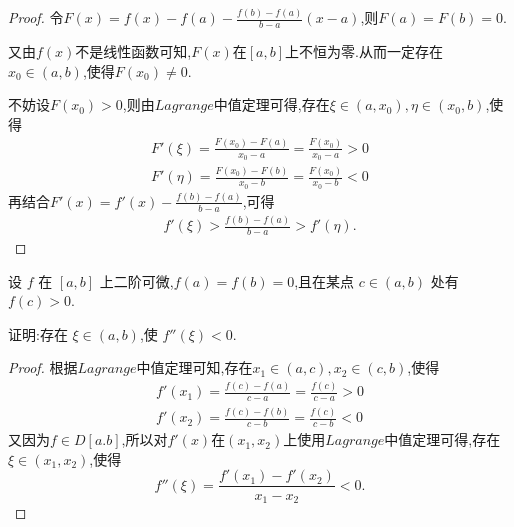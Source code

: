 \documentclass[lang=cn,newtx,10pt,scheme=chinese]{elegantbook}
\begin{document}
\begin{proof}
    令$F\left( x \right) =f\left( x \right) -f\left( a \right) -\frac{f\left( b \right) -f\left( a \right)}{b-a}\left( x-a \right)$,则$F(a)=F(b)=0$.
    
    又由$f(x)$不是线性函数可知,$F(x)$在$[a,b]$上不恒为零.从而一定存在$x_0\in(a,b)$,使得$F(x_0)\ne0$.
    
    不妨设$F(x_0)>0$,则由$Lagrange$中值定理可得,存在$\xi\in(a,x_0),\eta\in(x_0,b)$,使得
    \begin{gather}
        F'\left( \xi \right) =\frac{F\left( x_0 \right) -F\left( a \right)}{x_0-a}=\frac{F\left( x_0 \right)}{x_0-a}>0
        \nonumber\\
        F'\left( \eta \right) =\frac{F\left( x_0 \right) -F\left( b \right)}{x_0-b}=\frac{F\left( x_0 \right)}{x_0-b}<0        
        \nonumber
    \end{gather}
    再结合$F'(x)=f'(x)-\frac{f\left( b \right) -f\left( a \right)}{b-a}$,可得
    \begin{gather}
        f'(\xi)>\frac{f(b)-f(a)}{b-a}>f'(\eta).
        \nonumber
    \end{gather}
\end{proof}

\begin{exercise}
    设 \( f \) 在 \([a, b]\) 上二阶可微,\( f(a) = f(b) = 0 \),且在某点 \( c \in (a, b) \) 处有 \( f(c) > 0 \).
    
    证明:存在 \(\xi \in (a, b)\),使 \( f''(\xi) < 0 \).    
\end{exercise}
\begin{proof}
    根据$Lagrange$中值定理可知,存在$x_1\in(a,c),x_2\in(c,b)$,使得
    \begin{gather}
        f'\left( x_1 \right) =\frac{f\left( c \right) -f\left( a \right)}{c-a}=\frac{f\left( c \right)}{c-a}>0
        \nonumber\\
        f'\left( x_2 \right) =\frac{f\left( c \right) -f\left( b \right)}{c-b}=\frac{f\left( c \right)}{c-b}<0
        \nonumber
    \end{gather}
    又因为$f\in D[a.b]$,所以对$f'(x)$在$(x_1,x_2)$上使用$Lagrange$中值定理可得,存在$\xi\in(x_1,x_2)$,使得
    \begin{equation}
        f''\left( \xi \right) =\frac{f\prime\left( x_1 \right) -f\prime\left( x_2 \right)}{x_1-x_2}<0.
        \nonumber
    \end{equation}
\end{proof}
\end{document}

